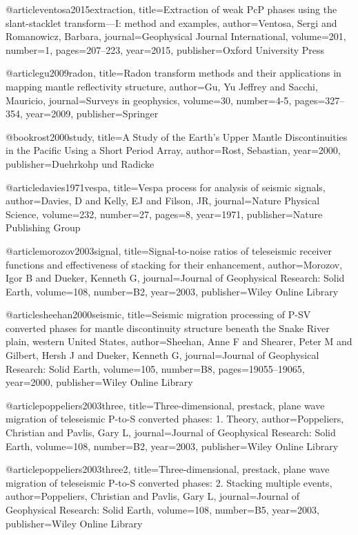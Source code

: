 @article{ventosa2015extraction,
  title={Extraction of weak PcP phases using the slant-stacklet transform—I: method and examples},
  author={Ventosa, Sergi and Romanowicz, Barbara},
  journal={Geophysical Journal International},
  volume={201},
  number={1},
  pages={207--223},
  year={2015},
  publisher={Oxford University Press}
}

@article{gu2009radon,
  title={Radon transform methods and their applications in mapping mantle reflectivity structure},
  author={Gu, Yu Jeffrey and Sacchi, Mauricio},
  journal={Surveys in geophysics},
  volume={30},
  number={4-5},
  pages={327--354},
  year={2009},
  publisher={Springer}
}


@book{rost2000study,
  title={A Study of the Earth's Upper Mantle Discontinuities in the Pacific Using a Short Period Array},
  author={Rost, Sebastian},
  year={2000},
  publisher={Duehrkohp und Radicke}
}

@article{davies1971vespa,
  title={Vespa process for analysis of seismic signals},
  author={Davies, D and Kelly, EJ and Filson, JR},
  journal={Nature Physical Science},
  volume={232},
  number={27},
  pages={8},
  year={1971},
  publisher={Nature Publishing Group}
}


@article{morozov2003signal,
  title={Signal-to-noise ratios of teleseismic receiver functions and effectiveness of stacking for their enhancement},
  author={Morozov, Igor B and Dueker, Kenneth G},
  journal={Journal of Geophysical Research: Solid Earth},
  volume={108},
  number={B2},
  year={2003},
  publisher={Wiley Online Library}
}

@article{sheehan2000seismic,
  title={Seismic migration processing of P-SV converted phases for mantle discontinuity structure beneath the Snake River plain, western United States},
  author={Sheehan, Anne F and Shearer, Peter M and Gilbert, Hersh J and Dueker, Kenneth G},
  journal={Journal of Geophysical Research: Solid Earth},
  volume={105},
  number={B8},
  pages={19055--19065},
  year={2000},
  publisher={Wiley Online Library}
}


@article{poppeliers2003three,
  title={Three-dimensional, prestack, plane wave migration of teleseismic P-to-S converted phases: 1. Theory},
  author={Poppeliers, Christian and Pavlis, Gary L},
  journal={Journal of Geophysical Research: Solid Earth},
  volume={108},
  number={B2},
  year={2003},
  publisher={Wiley Online Library}
}

@article{poppeliers2003three2,
  title={Three-dimensional, prestack, plane wave migration of teleseismic P-to-S converted phases: 2. Stacking multiple events},
  author={Poppeliers, Christian and Pavlis, Gary L},
  journal={Journal of Geophysical Research: Solid Earth},
  volume={108},
  number={B5},
  year={2003},
  publisher={Wiley Online Library}
}

